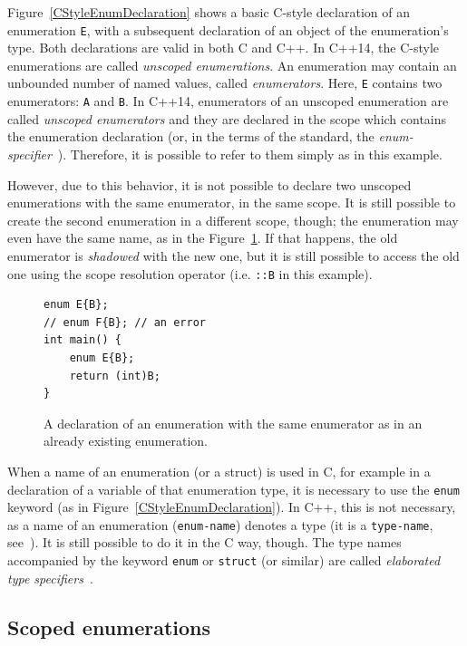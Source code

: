 \documentclass[nolot,nolof,nocover,printed]{fithesis3}
\newcommand{\stdN}[2]{\cite[#2]{#1}\xspace}
\begin{document}
Figure~\ref{CStyleEnumDeclaration} shows a basic C-style declaration of an enumeration \texttt{E}, with a subsequent declaration of an object of the enumeration's type. Both declarations are valid in both C and C++. In C++14, the C-style enumerations are called \textit{unscoped enumerations}. An enumeration may contain an unbounded number of named values, called \textit{enumerators}. Here, \texttt{E} contains two enumerators: \texttt{A} and \texttt{B}. In C++14, enumerators of an unscoped enumeration are called \textit{unscoped enumerators} and they are declared in the scope which contains the enumeration declaration (or, in the terms of the standard, the \textit{enum-specifier}~\stdN{n4296}{\S 7.2/11}). Therefore, it is possible to refer to them simply as in this example.

However, due to this behavior, it is not possible to declare two unscoped enumerations with the same enumerator, in the same scope. It is still possible to create the second enumeration in a different scope, though; the enumeration may even have the same name, as in the Figure~\ref{fig:collidingEnumerators}. If that happens, the old enumerator is \textit{shadowed} with the new one, but it is still possible to access the old one using the scope resolution operator (i.e. \texttt{::B} in this example).
\begin{figure}
\begin{lstlisting}
enum E{B};
// enum F{B}; // an error
int main() { 
    enum E{B};
    return (int)B;
}  
\end{lstlisting}
\caption{A declaration of an enumeration with the same enumerator as in an already existing enumeration.}
\label{fig:collidingEnumerators}
\end{figure}


When a name of an enumeration (or a struct) is used in C, for example in a declaration of a variable of that enumeration type, it is necessary to use the \texttt{enum} keyword (as in Figure~\ref{CStyleEnumDeclaration}). In C++, this is not necessary, as a name of an enumeration (\texttt{enum-name}) denotes a type (it is a \texttt{type-name}, see~\stdN{n4296}{Annex A.1}). It is still possible to do it in the C way, though. The type names accompanied by the keyword \texttt{enum} or \texttt{struct} (or similar) are called \textit{elaborated type specifiers}~\stdN{n4296}{\S 3.4.4}.

\subsection{Scoped enumerations}
\end{document}
